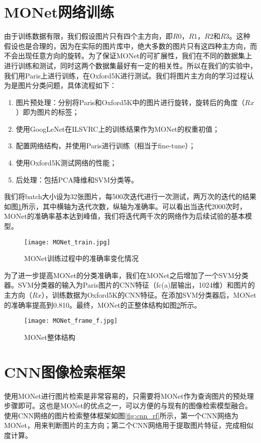\section{MONet网络训练}
由于训练数据有限，我们假设图片只有四个主方向，即$R0$，$R1$，$R2$和$R3$。这种假设也是合理的，因为在实际的图片库中，绝大多数的图片只有这四种主方向，而不会出现任意方向的旋转。为了保证MONet的可扩展性，我们在不同的数据集上进行训练和测试，同时这两个数据集最好有一定的相关性。所以在我们的实验中，我们用Paris\cite{philbin2008lost}上进行训练，在Oxford5K\cite{philbin2007object}进行测试。我们将图片主方向的学习过程认为是图片分类问题，具体流程如下：
\begin{enumerate}
	\item 图片预处理：分别将Paris和Oxford5K中的图片进行旋转，旋转后的角度（$Rx$）即为图片的标签；
	\item 使用GoogLeNet在ILSVRC上的训练结果作为MONet的权重初值；
	\item 配置网络结构，并使用Paris进行训练（相当于fine-tune）；
	\item 使用Oxford5K测试网络的性能；
	\item 后处理：包括PCA降维和SVM分类等。
\end{enumerate}

我们将batch大小设为32张图片，每500次迭代进行一次测试，两万次的迭代的结果如图\ref{fig:monet_t}所示，其中横轴为迭代次数，纵轴为准确率。可以看出当迭代2000次时，MONet的准确率基本达到峰值，我们将迭代两千次的网络作为后续试验的基本模型。

\begin{figure}
	\centering
	\texttt{[image: MONet\_train.jpg]}
	\caption{MONet训练过程中的准确率变化情况}\label{fig:monet_t}
\end{figure}

为了进一步提高MONet的分类准确率，我们在MONet之后增加了一个SVM分类器。SVM分类器的输入为Paris图片的CNN特征（fc(a)层输出，1024维）和图片的主方向（$Rx$），训练数据为Oxford5K的CNN特征。在添加SVM分类器后，MONet的准确率提高到0.810。最终，MONet的正整体结构如图\ref{fig:monet_ff}所示。

\begin{figure}
	\centering
	\texttt{[image: MONet\_frame\_f.jpg]}
	\caption{MONet整体结构}\label{fig:monet_ff}
\end{figure}

\section{CNN图像检索框架}
使用MONet进行图片检索是非常容易的，只需要将MONet作为查询图片的预处理步骤即可。这也是MONet的优点之一，可以方便的与现有的图像检索模型融合。使用CNN网络的图片检索整体框架如图\ref{fig:cnn_rf}所示，第一个CNN网络为MONet，用来判断图片的主方向；第二个CNN网络用于提取图片特征，完成相似度计算。

